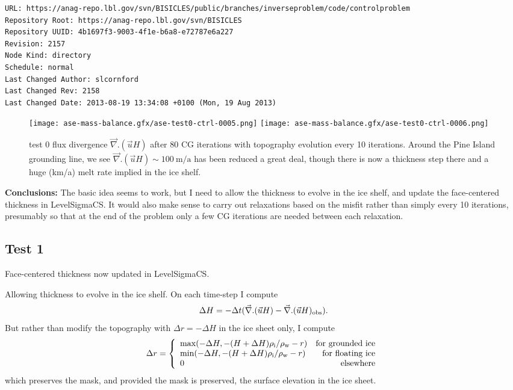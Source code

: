 \documentclass{article}
\begin{document}
\begin{verbatim}
URL: https://anag-repo.lbl.gov/svn/BISICLES/public/branches/inverseproblem/code/controlproblem
Repository Root: https://anag-repo.lbl.gov/svn/BISICLES
Repository UUID: 4b1697f3-9003-4f1e-b6a8-e72787e6a227
Revision: 2157
Node Kind: directory
Schedule: normal
Last Changed Author: slcornford
Last Changed Rev: 2158
Last Changed Date: 2013-08-19 13:34:08 +0100 (Mon, 19 Aug 2013)
\end{verbatim}


\begin{figure}
\begin{center}
\texttt{[image: ase-mass-balance.gfx/ase-test0-ctrl-0005.png]}
\texttt{[image: ase-mass-balance.gfx/ase-test0-ctrl-0006.png]}
\end{center}
\caption{\protect{\label{fig::divuh10}}} test 0 flux divergence $\vec{\nabla}. (\vec{u} H)$
after 80 CG iterations with topography evolution every 10 iterations. 
Around the Pine Island grounding line, we see $\vec{\nabla}. (\vec{u} H) \sim 100~\mbox{m/a}$ has
been reduced a great deal, though there is now a thickness step there and a huge (km/a) melt rate
implied in the ice shelf.
\end{figure}

{\large {\bf Conclusions:}} The basic idea seems to work, but I need to allow the thickness to evolve in the ice shelf, and
update the face-centered thickness in LevelSigmaCS. It would also make sense to carry out relaxations based on the misfit rather
than simply every 10 iterations, presumably so that at the end of the problem only a few CG iterations are needed 
between each relaxation.

\newpage

\subsection{Test 1}

Face-centered thickness now updated in LevelSigmaCS.

Allowing thickness to evolve in the ice shelf. On each time-step I compute
\begin{equation}
\Delta H = - \Delta t ( \vec{\nabla}. (\vec{u} H) - \vec{\nabla}. (\vec{u} H) _{\rm obs}).
\end{equation}
But rather than modify the topography with $\Delta r = -\Delta H$ in the ice sheet only, I compute 
\begin{equation}
  \Delta r = \left \{ 
  \begin{array}{lr} 
    {\rm max} (-\Delta H,  -(H + \Delta H)  \rho_{\rm i}/\rho_{\rm w} - r) & \mbox{for grounded ice} \\
    {\rm min} (-\Delta H,  -(H + \Delta H) \rho_{\rm i}/\rho_{\rm w} - r)& \mbox{for floating ice} \\
    0 & \mbox{elsewhere}
  \end{array} \right. 
\end{equation}
which preserves the mask, and provided the mask is preserved, the surface elevation in the ice sheet.
\end{document}
